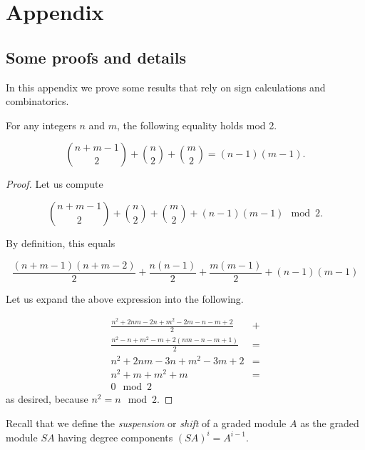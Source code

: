 \documentclass[Thesis.tex]{subfiles}
\begin{document}
\chapter*{Appendix}
\appendix
\setcounter{equation}{0}
\renewcommand\theequation{\thesection\arabic{equation}}
\gdef\thesection{\Alph{section}}
\section{Some proofs and details}\label{AppA}
In this appendix we prove some results that rely on sign calculations and combinatorics.


\begin{lem}\label{binom}
For any integers $n$ and $m$, the following equality holds mod 2.

\[\binom{n+m-1}{2}+\binom{n}{2}+\binom{m}{2}=(n-1)(m-1).\]
\end{lem}
\begin{proof}
Let us compute 

\[\binom{n+m-1}{2}+\binom{n}{2}+\binom{m}{2}+(n-1)(m-1)\mod 2.\]

By definition, this equals

\[\frac{(n+m-1)(n+m-2)}{2}+\frac{n(n-1)}{2}+\frac{m(m-1)}{2}+(n-1)(m-1)\]

Let us expand the above expression into the following.

\begin{align*}
\frac{n^2+2nm-2n+m^2-2m-n-m+2}{2}&+\\
\frac{n^2-n+m^2-m+2(nm-n-m+1)}{2}&=\\
n^2+2nm-3n+m^2-3m+2&=\\
n^2+m+m^2+m&=\\
0\mod 2
\end{align*}
as desired, because $n^2=n\mod 2$.


\end{proof}




Recall that we define the \emph{suspension} or \emph{shift} of a graded module $A$ as the graded module $S A$ having degree components $(S A)^i=A^{i-1}$.
\end{document}
